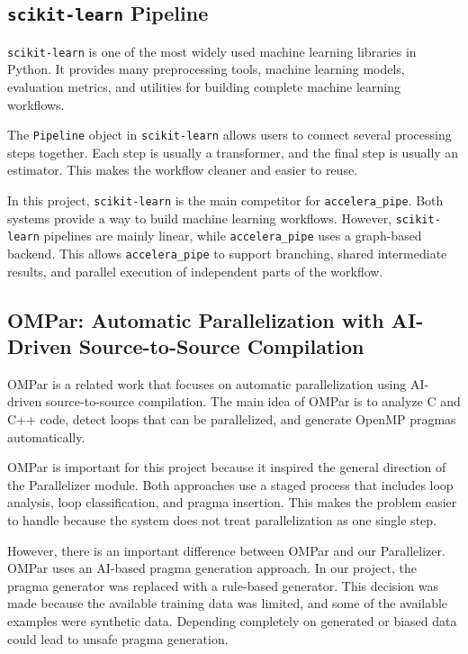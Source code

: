 \documentclass[12pt,a4paper]{report}
\begin{document}
\subsection{\texttt{scikit-learn} Pipeline}
\texttt{scikit-learn} is one of the most widely used machine learning libraries
in Python. It provides many preprocessing tools, machine learning models,
evaluation metrics, and utilities for building complete machine learning
workflows.

The \texttt{Pipeline} object in \texttt{scikit-learn} allows users to connect
several processing steps together. Each step is usually a transformer, and the
final step is usually an estimator. This makes the workflow cleaner and easier
to reuse.

In this project, \texttt{scikit-learn} is the main competitor for
\texttt{accelera\_pipe}. Both systems provide a way to build machine learning
workflows. However, \texttt{scikit-learn} pipelines are mainly linear, while
\texttt{accelera\_pipe} uses a graph-based backend. This allows
\texttt{accelera\_pipe} to support branching, shared intermediate results, and
parallel execution of independent parts of the workflow.

\subsection{OMPar: Automatic Parallelization with AI-Driven Source-to-Source Compilation}
OMPar is a related work that focuses on automatic parallelization using
AI-driven source-to-source compilation. The main idea of OMPar is to analyze C
and C++ code, detect loops that can be parallelized, and generate OpenMP pragmas
automatically.

OMPar is important for this project because it inspired the general direction of
the Parallelizer module. Both approaches use a staged process that includes loop
analysis, loop classification, and pragma insertion. This makes the problem
easier to handle because the system does not treat parallelization as one single
step.

However, there is an important difference between OMPar and our Parallelizer.
OMPar uses an AI-based pragma generation approach. In our project, the pragma
generator was replaced with a rule-based generator. This decision was made
because the available training data was limited, and some of the available
examples were synthetic data. Depending completely on generated or biased data
could lead to unsafe pragma generation.
\end{document}

